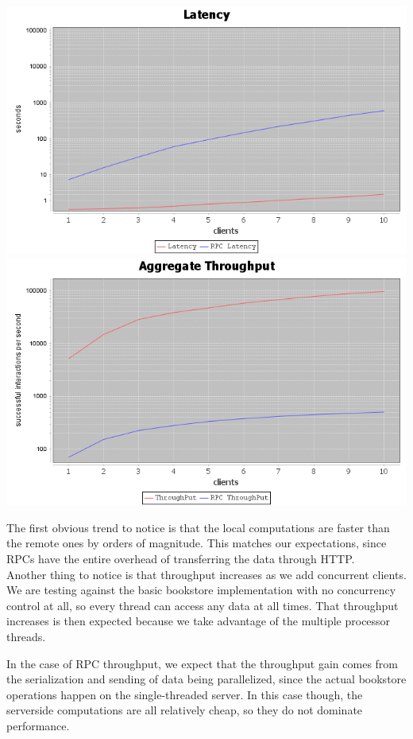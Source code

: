 \documentclass[11pt]{article}
\begin{document}
\begin{enumerate}
      \includegraphics[scale=0.5]{latency}
      \includegraphics[scale=0.5]{throughput}

      The first obvious trend to notice is that the local computations are
      faster than the remote ones by orders of magnitude. This matches our
      expectations, since RPCs have the entire overhead of transferring the data
      through HTTP.\\

      Another thing to notice is that throughput increases as we add concurrent
      clients. We are testing against the basic bookstore implementation with no
      concurrency control at all, so every thread can access any data at all
      times. That throughput increases is then expected because we take
      advantage of the multiple processor threads.

      In the case of RPC throughput, we expect that the throughput gain comes
      from the serialization and sending of data being parallelized, since the
      actual bookstore operations happen on the single-threaded server. In this
      case though, the serverside computations are all relatively cheap, so they
      do not dominate performance.\\


\end{enumerate}
\end{document}
